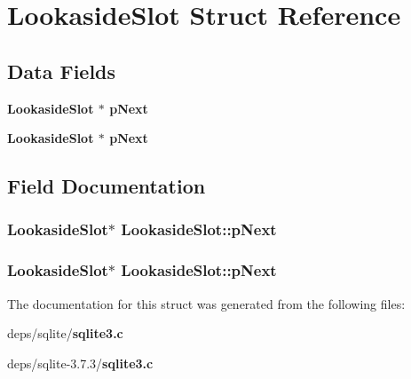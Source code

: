 \section{Lookaside\-Slot Struct Reference}
\label{structLookasideSlot}
\subsection*{Data Fields}
\begin{CompactItemize}
\item 
\bf{Lookaside\-Slot} $\ast$ \bf{p\-Next}
\item 
\bf{Lookaside\-Slot} $\ast$ \bf{p\-Next}
\end{CompactItemize}


\subsection{Field Documentation}
\subsubsection{\setlength{\rightskip}{0pt plus 5cm}\bf{Lookaside\-Slot}$\ast$ \bf{Lookaside\-Slot::p\-Next}}\label{structLookasideSlot_05eaf9ca7b4f0830cf3241daeff6dd71}


\subsubsection{\setlength{\rightskip}{0pt plus 5cm}\bf{Lookaside\-Slot}$\ast$ \bf{Lookaside\-Slot::p\-Next}}\label{structLookasideSlot_05eaf9ca7b4f0830cf3241daeff6dd71}




The documentation for this struct was generated from the following files:\begin{CompactItemize}
\item 
deps/sqlite/\bf{sqlite3.c}\item 
deps/sqlite-3.7.3/\bf{sqlite3.c}\end{CompactItemize}
